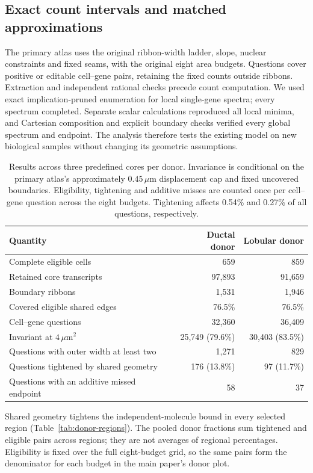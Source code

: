 \FloatBarrier
\subsection{Exact count intervals and matched approximations}
The primary atlas uses the original ribbon-width ladder, slope, nuclear constraints and fixed seams, with the original eight area budgets. Questions cover positive or editable cell--gene pairs, retaining the fixed counts outside ribbons. Extraction and independent rational checks precede count computation. We used exact implication-pruned enumeration for local single-gene spectra; every spectrum completed. Separate scalar calculations reproduced all local minima, and Cartesian composition and explicit boundary checks verified every global spectrum and endpoint. The analysis therefore tests the existing model on new biological samples without changing its geometric assumptions.

\begin{table}[ht]\centering
\begin{tabular}{lrr}\toprule
Quantity&Ductal donor&Lobular donor\\\midrule
Complete eligible cells&659&859\\
Retained core transcripts&97,893&91,659\\
Boundary ribbons&1,531&1,946\\
Covered eligible shared edges&76.5\%&76.5\%\\
Cell--gene questions&32,360&36,409\\
Invariant at $4\,\mu\mathrm m^2$&25,749 (79.6\%)&30,403 (83.5\%)\\
Questions with outer width at least two&1,271&829\\
Questions tightened by shared geometry&176 (13.8\%)&97 (11.7\%)\\
Questions with an additive missed endpoint&58&37\\\bottomrule
\end{tabular}
\caption{Results across three predefined cores per donor. Invariance is conditional on the primary atlas's approximately $0.45\,\mu\mathrm m$ displacement cap and fixed uncovered boundaries. Eligibility, tightening and additive misses are counted once per cell--gene question across the eight budgets. Tightening affects 0.54\% and 0.27\% of all questions, respectively.}\label{tab:biological-replication}
\end{table}

Shared geometry tightens the independent-molecule bound in every selected region (Table~\ref{tab:donor-regions}). The pooled donor fractions sum tightened and eligible pairs across regions; they are not averages of regional percentages. Eligibility is fixed over the full eight-budget grid, so the same pairs form the denominator for each budget in the main paper's donor plot.


